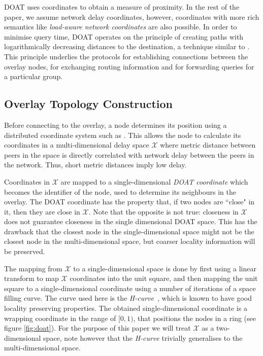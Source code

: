 
DOAT uses coordinates to obtain a measure of proximity. In the rest of the paper,
we assume network delay coordinates, however, coordinates
with more rich semantics like \emph{load-aware network coordinates} \cite{LANC}
are also possible. 
In order to minimise query time, DOAT operates on the principle of creating
paths with logarithmically decreasing distances to the destination, a
technique similar to \cite{stoicachord}. This principle underlies the
protocols for establishing connections between the overlay nodes, 
for exchanging routing information and for
forwarding queries for a particular group. 


\subsection{Overlay Topology Construction}
\label{subsect:neighbors}
Before connecting to the overlay, a node determines its position
using a distributed coordinate system such as \cite{vivaldi}.  This
allows the node to calculate its coordinates
in a multi-dimensional delay space $\mathcal{X}$ where metric distance
between peers in the space is directly correlated with
network delay between the peers in the network. Thus, short metric
distances imply low delay.

Coordinates in
$\mathcal{X}$ are mapped to a single-dimensional \emph{DOAT coordinate}
which becomes the identifier of the node, used to determine its neighbours in
the overlay.
The DOAT
coordinate has the property that, if two nodes are ``close" in it, 
then they are close in $\mathcal{X}$. 
Note that the opposite is not true: closeness in
$\mathcal{X}$ does not guarantee closeness in the single dimensional DOAT
space. This has the drawback that the closest node in the single-dimensional 
space might not be the closest node in the multi-dimensional
space, but coarser locality information will be preserved.

The mapping from  $\mathcal{X}$ to a 
single-dimensional space is done by
first using a linear transform to map $\mathcal{X}$ coordinates into the
unit square, and
then mapping the unit square to a single-dimensional coordinate using a number of
iterations
of a space filling curve.  The curve used here is the
\emph{H-curve}~\cite{hcurve}, which is known
to have good locality preserving properties.
The obtained single-dimensional coordinate is a wrapping coordinate in the
range of $[0,1)$, that positions the nodes in a ring 
(see figure \ref{fig:doat}).
For the purpose of this paper we will treat $\mathcal{X}$ as a
two-dimensional space, note however that the \emph{H-curve} trivially generalises 
to the multi-dimensional space.


